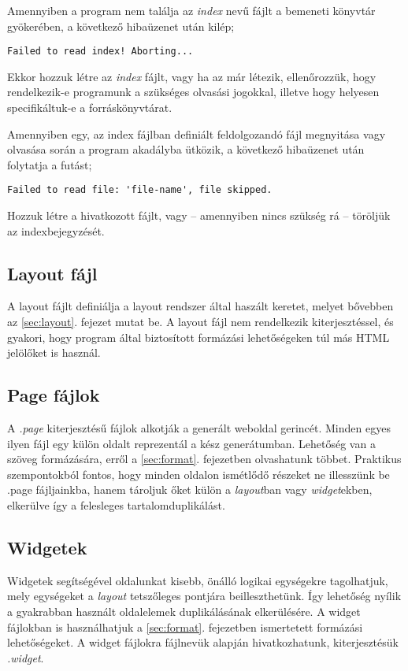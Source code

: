 \documentclass[a4paper,10pt]{article}
\begin{document}
Amennyiben a program nem találja az \emph{index} nevű fájlt a bemeneti könyvtár gyökerében, a következő hibaüzenet után kilép;

\begin{lstlisting}
Failed to read index! Aborting...
\end{lstlisting}

Ekkor hozzuk létre az \emph{index} fájlt, vagy ha az már létezik, ellenőrozzük, hogy rendelkezik-e programunk a szükséges olvasási jogokkal, illetve hogy helyesen specifikáltuk-e a forráskönyvtárat.

Amennyiben egy, az index fájlban definiált feldolgozandó fájl megnyitása vagy olvasása során a program akadályba ütközik, a következő hibaüzenet után folytatja a futást;

\begin{lstlisting}
Failed to read file: 'file-name', file skipped.
\end{lstlisting}

Hozzuk létre a hivatkozott fájlt, vagy -- amennyiben nincs szükség rá -- töröljük az indexbejegyzését.

\subsection{Layout fájl}
A layout fájlt definiálja a layout rendszer által haszált keretet, melyet bővebben az \ref{sec:layout}. fejezet mutat be. A layout fájl nem rendelkezik kiterjesztéssel, és gyakori, hogy program által biztosított formázási lehetőségeken túl más HTML jelölőket is használ.

\subsection{Page fájlok}
A \emph{.page} kiterjesztésű fájlok alkotják a generált weboldal gerincét. Minden egyes ilyen fájl egy külön oldalt reprezentál a kész generátumban. Lehetőség van a szöveg formázására, erről a \ref{sec:format}. fejezetben olvashatunk többet.
Praktikus szempontokból fontos, hogy minden oldalon ismétlődő részeket ne illesszünk be .page fájljainkba, hanem tároljuk őket külön a \emph{layout}ban vagy \emph{widget}ekben, elkerülve így a felesleges tartalomduplikálást.
\subsection{Widgetek}
Widgetek segítségével oldalunkat kisebb, önálló logikai egységekre tagolhatjuk, mely egységeket a \emph{layout} tetszőleges pontjára beilleszthetünk. Így lehetőség nyílik a gyakrabban használt oldalelemek duplikálásának elkerülésére. A widget fájlokban is használhatjuk a \ref{sec:format}. fejezetben ismertetett formázási lehetőségeket. A widget fájlokra fájlnevük alapján hivatkozhatunk, kiterjesztésük \emph{.widget}.
\end{document}
